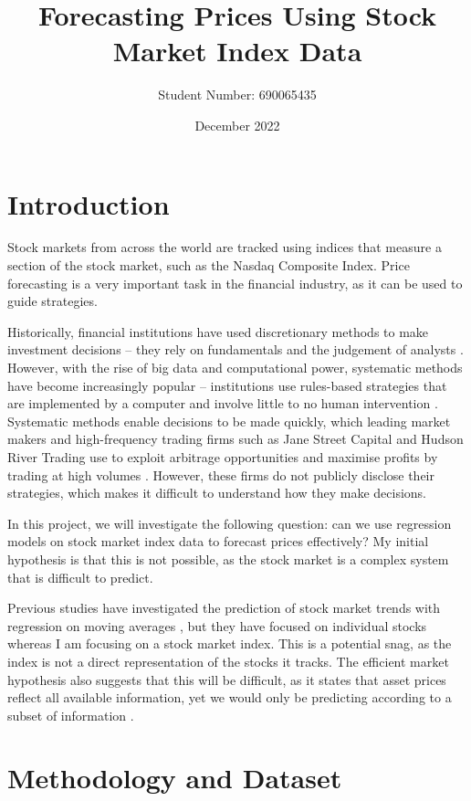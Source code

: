 \documentclass[a4paper, 11pt]{article}
\begin{document}
\title{Forecasting Prices Using Stock Market Index Data}
\author{Student Number: 690065435}
\date{December 2022}
\maketitle

\section{Introduction}
Stock markets from across the world are tracked using indices that measure a section of the stock market, such as the Nasdaq Composite Index. Price forecasting is a very important task in the financial industry, as it can be used to guide strategies.

Historically, financial institutions have used discretionary methods to make investment decisions -- they rely on fundamentals and the judgement of analysts \cite{harvey2017man}. However, with the rise of big data and computational power, systematic methods have become increasingly popular -- institutions use rules-based strategies that are implemented by a computer and involve little to no human intervention \cite{harvey2017man}. Systematic methods enable decisions to be made quickly, which leading market makers and high-frequency trading firms such as Jane Street Capital and Hudson River Trading use to exploit arbitrage opportunities and maximise profits by trading at high volumes \cite{aldridge2013high}. However, these firms do not publicly disclose their strategies, which makes it difficult to understand how they make decisions.

In this project, we will investigate the following question: can we use regression models on stock market index data to forecast prices effectively? My initial hypothesis is that this is not possible, as the stock market is a complex system that is difficult to predict.

Previous studies have investigated the prediction of stock market trends with regression on moving averages \cite{dinesh2021prediction}, but they have focused on individual stocks whereas I am focusing on a stock market index. This is a potential snag, as the index is not a direct representation of the stocks it tracks. The efficient market hypothesis also suggests that this will be difficult, as it states that asset prices reflect all available information, yet we would only be predicting according to a subset of information \cite{fama1970efficient}. 

\section{Methodology and Dataset}
\end{document}
